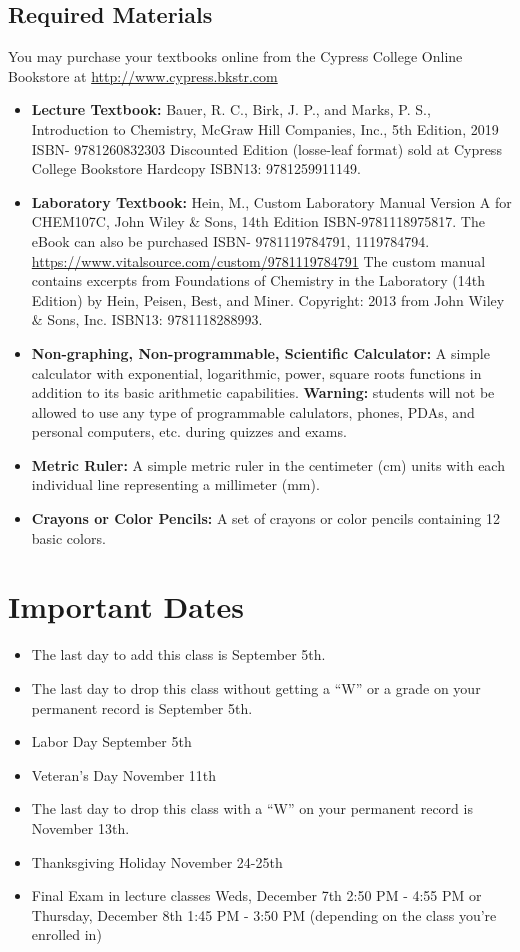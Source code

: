 \documentclass[11pt]{article}
\begin{document}
\subsection{Required Materials}

You may purchase your textbooks online from the Cypress College Online Bookstore
at \url{http://www.cypress.bkstr.com}

\begin{itemize}
\item \textbf{Lecture Textbook:} Bauer, R. C., Birk, J. P., and Marks, P. S., Introduction
  to Chemistry, McGraw Hill Companies, Inc., 5th Edition, 2019 ISBN- 9781260832303
  Discounted Edition (losse-leaf format) sold at Cypress College Bookstore 
  Hardcopy ISBN13: 9781259911149.
\item \textbf{Laboratory Textbook:} Hein, M., Custom Laboratory Manual Version A for CHEM107C,
  John Wiley \& Sons, 14th Edition ISBN-9781118975817.
  The eBook can also be purchased ISBN- 9781119784791, 1119784794.
  \url{https://www.vitalsource.com/custom/9781119784791}
  The custom manual contains excerpts from Foundations of Chemistry in the Laboratory
  (14th Edition) by Hein, Peisen, Best, and Miner.  Copyright: 2013 from John Wiley \& Sons,
  Inc. ISBN13: 9781118288993.
\item \textbf{Non-graphing, Non-programmable, Scientific Calculator:}
  A simple calculator with exponential, logarithmic, power, square roots functions in
  addition to its basic arithmetic capabilities. \textbf{Warning:} students will not be allowed
  to use any type of programmable calulators, phones, PDAs, and personal computers, etc.
  during quizzes and exams.
\item \textbf{Metric Ruler:} A simple metric ruler in the centimeter (cm) units with each individual
  line representing a millimeter (mm). 
\item \textbf{Crayons or Color Pencils:} A set of crayons or color pencils containing 12 basic colors.    
\end{itemize}

\section{Important Dates}
\begin{itemize}
\item The last day to add this class is September 5th.
\item The last day to drop this class without getting a “W” or a grade on your permanent
  record is September 5th.
\item Labor Day September 5th
\item Veteran’s Day November 11th
\item The last day to drop this class with a “W” on your permanent record is November 13th.
\item Thanksgiving Holiday November 24-25th
\item Final Exam in lecture classes Weds, December 7th 2:50 PM - 4:55 PM or
  Thursday, December 8th 1:45 PM - 3:50 PM (depending on the class you're enrolled in)
\end{itemize}
\end{document}
